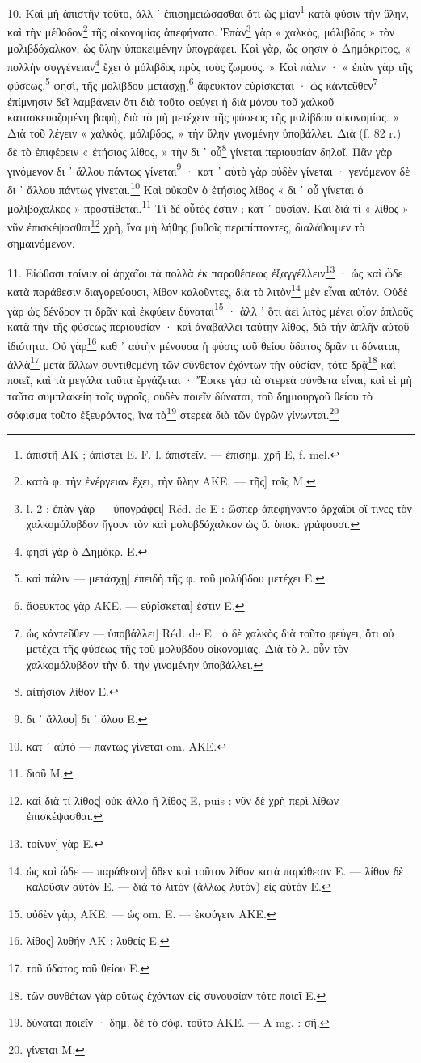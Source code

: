 \documentclass[a4paper, 11pt, oneside, polutonikogreek, french]{article}
\begin{document}
10. Καὶ μὴ ἀπιστῆν τοῦτο, ἀλλ ᾽ ἐπισημειώσασθαι ὅτι ὡς μίαν\footnote{ἀπιστῆ AK ; ἀπίστει E. F. l. ἀπιστεῖν. --- ἐπισημ. χρῆ E, f. mel.} κατὰ φύσιν τὴν ὕλην, καὶ τὴν μέθοδον\footnote{κατὰ φ. τὴν ἐνέργειαν ἔχει, τὴν ὕλην AKE. --- τῆς] τοῖς M.} τῆς οἰκονομίας ἀπεφήνατο. Ἐπὰν\footnote{l. 2 : ἐπὰν γὰρ --- ὑπογράφει] Réd. de E : ὥσπερ ἀπεφήναντο ἀρχαῖοι οἵ τινες τὸν χαλκομόλυβδον ἤγουν τὸν καὶ μολυβδόχαλκον ὡς ὕ. ὑποκ. γράφουσι.} γὰρ « χαλκὸς, μόλιβδος » τὸν μολιβδόχαλκον, ὡς ὕλην ὑποκειμένην ὑπογράφει. Καὶ γὰρ, ὥς φησιν ὁ Δημόκριτος, « πολλὴν συγγένειαν\footnote{φησὶ γὰρ ὁ Δημόκρ. E.} ἔχει ὁ μόλιβδος πρὸς τοὺς ζωμούς. » Καὶ πάλιν · « ἐπὰν γὰρ τῆς φύσεως,\footnote{καὶ πάλιν --- μετάσχῃ] ἐπειδὴ τῆς φ. τοῦ μολύβδου μετέχει E.} φησὶ, τῆς μολίβδου μετάσχῃ,\footnote{ἄφευκτος γὰρ AKE. --- εὑρίσκεται] ἐστιν E.} ἄφευκτον εὑρίσκεται · ὡς κἀντεῦθεν\footnote{ὡς κἀντεῦθεν --- ὑποβάλλει] Réd. de E : ὁ δὲ χαλκὸς διὰ τοῦτο φεύγει, ὅτι οὐ μετέχει τῆς φύσεως τῆς τοῦ μολύβδου οἰκονομίας. Διὰ τὸ λ. οὗν τὸν χαλκομόλυβδον τὴν ὕ. τὴν γινομένην ὑποβάλλει.} ἐπίμνησιν δεῖ λαμβάνειν ὅτι διὰ τοῦτο φεύγει ἡ διὰ μόνου τοῦ χαλκοῦ κατασκευαζομένη βαφὴ, διὰ τὸ μὴ μετέχειν τῆς φύσεως τῆς μολίβδου οἰκονομίας. » Διὰ τοῦ λέγειν « χαλκὸς, μόλιβδος, » τὴν ὕλην γινομένην ὑποβάλλει. Διὰ (f. 82 r.) δὲ τὸ ἐπιφέρειν « ἐτήσιος λίθος, » τὴν δι ᾽ οὗ\footnote{αἰτήσιον λίθον E.} γίνεται περιουσίαν δηλοῖ. Πᾶν γὰρ γινόμενον δι ᾽ ἄλλου πάντως γίνεται\footnote{δι ᾽ ἄλλου] δι ᾽ ὅλου E.} · κατ ᾽ αὐτὸ γὰρ οὐδὲν γίνεται · γενόμενον δὲ δι ᾽ ἄλλου πάντως γίνεται.\footnote{κατ ᾽ αὐτὸ --- πάντως γίνεται om. AKE.} Καὶ οὐκοῦν ὁ ἐτήσιος λίθος « δι ᾽ οὗ γίνεται ὁ μολιβόχαλκος » προστίθεται.\footnote{διοῦ M.} Τί δὲ οὗτός ἐστιν ; κατ ᾽ οὐσίαν. Καὶ διὰ τί « λίθος » νῦν ἐπισκέψασθαι\footnote{καὶ διὰ τί λίθος] οὐκ ἄλλο ἢ λίθος E, puis : νῦν δὲ χρὴ περὶ λίθων ἐπισκέψασθαι.} χρὴ, ἵνα μὴ λήθης βυθοῖς περιπίπτοντες, διαλάθοιμεν τὸ σημαινόμενον.

11. Εἰώθασι τοίνυν οἱ ἀρχαῖοι τὰ πολλὰ ἐκ παραθέσεως ἐξαγγέλλειν\footnote{τοίνυν] γὰρ E.} · ὡς καὶ ὧδε κατὰ παράθεσιν διαγορεύουσι, λίθον καλοῦντες, διὰ τὸ λιτὸν\footnote{ὡς καὶ ὧδε --- παράθεσιν] ὅθεν καὶ τοῦτον λίθον κατὰ παράθεσιν E. --- λίθον δὲ καλοῦσιν αὐτὸν E. --- διὰ τὸ λιτὸν (ἄλλως λυτὸν) εἰς αὐτὸν E.} μὲν εἶναι αὐτόν. Οὐδὲ γὰρ ὡς δένδρον τι δρᾶν καὶ ἐκφύειν δύναται\footnote{οὐδὲν γὰρ, AKE. --- ὡς om. E. --- ἐκφύγειν AKE.} · ἀλλ ᾽ ὅτι ἀεὶ λιτὸς μένει οἷον ἁπλοῦς κατὰ τὴν τῆς φύσεως περιουσίαν · καὶ ἀναβάλλει ταύτην λίθος, διὰ τὴν ἁπλῆν αὐτοῦ ἰδιότητα. Οὐ γὰρ\footnote{λίθος] λυθήν AK ; λυθείς E.} καθ ᾽ αὑτὴν μένουσα ἡ φύσις τοῦ θείου ὕδατος δρᾶν τι δύναται, ἀλλὰ\footnote{τοῦ ὕδατος τοῦ θείου E.} μετὰ ἄλλων συντιθεμένη τῶν σύνθετον ἐχόντων τὴν οὐσίαν, τότε δρᾷ\footnote{τῶν συνθέτων γὰρ οὕτως ἐχόντων εἰς συνουσίαν τότε ποιεῖ E.} καὶ ποιεῖ, καὶ τὰ μεγάλα ταῦτα ἐργάζεται · Ἔοικε γὰρ τὰ στερεὰ σύνθετα εἶναι, καὶ εἰ μὴ ταῦτα συμπλακείη τοῖς ὑγροῖς, οὐδὲν ποιεῖν δύναται, τοῦ δημιουργοῦ θείου τὸ σόφισμα τοῦτο ἐξευρόντος, ἵνα τὰ\footnote{δύναται ποιεῖν · δημ. δὲ τὸ σόφ. τοῦτο AKE. --- A mg. : σῆ.} στερεὰ διὰ τῶν ὑγρῶν γίνωνται.\footnote{γίνεται M.}
\end{document}
